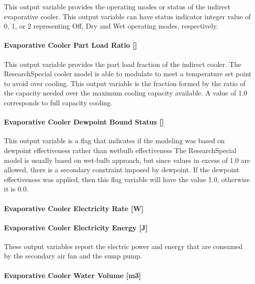 This output variable provides the operating modes or status of the indirect evaporative cooler. This output variable can have status indicator integer value of 0, 1, or 2 representing Off, Dry and Wet operating modes, respectively.

\paragraph{Evaporative Cooler Part Load Ratio {[]}}\label{evaporative-cooler-part-load-ratio}

This output variable provides the part load fraction of the indirect cooler. The ResearchSpecial cooler model is able to modulate to meet a temperature set point to avoid over cooling. This output variable is the fraction formed by the ratio of the capacity needed over the maximum cooling capacity available. A value of 1.0 corresponds to full capacity cooling.

\paragraph{Evaporative Cooler Dewpoint Bound Status {[]}}\label{evaporative-cooler-dewpoint-bound-status}

This output variable is a flag that indicates if the modeling was based on dewpoint effectiveness rather than wetbulb effectiveness The ResearchSpecial model is usually based on wet-bulb approach, but since values in excess of 1.0 are allowed, there is a secondary constraint imposed by dewpoint. If the dewpoint effectiveness was applied, then this flag variable will have the value 1.0, otherwise it is 0.0.

\paragraph{Evaporative Cooler Electricity Rate {[}W{]}}\label{evaporative-cooler-electric-power-w-1}

\paragraph{Evaporative Cooler Electricity Energy {[}J{]}}\label{evaporative-cooler-electric-energy-j-4}

These output variables report the electric power and energy that are consumed by the secondary air fan and the sump pump.

\paragraph{Evaporative Cooler Water Volume {[}m3{]}}\label{evaporative-cooler-water-volume-m3-3}

